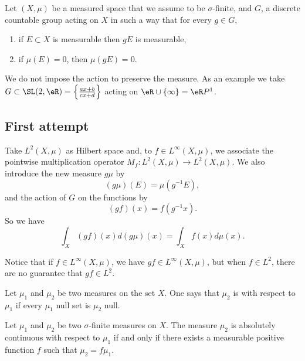 Let $(X,\mu)$ be a measured space that we assume to be $\sigma$-finite, and $G$, a discrete countable group acting on $X$ in such a way that for every $g\in G$,
\begin{enumerate}
\item if $E\subset X$ is measurable then $gE$ is measurable,
\item if $\mu(E)=0$, then $\mu(gE)=0$.
\end{enumerate}
We do not impose the action to preserve the measure. As an example we take $G\subset\SL(2,\eR)=\left\{ \frac{ ax+b }{ cx+d } \right\}$ acting on $\eR\cup\{ \infty\}=\eR P^1$.

					\subsection{First attempt}

Take $L^2(X,\mu)$ as Hilbert space and, to $f\in  L^{\infty}(X,\mu)$, we associate the pointwise multiplication operator $M_f\colon  L^2(X,\mu)\to  L^2 (X,\mu)$. We also introduce the new measure $g\mu$ by
\begin{equation}
		(g\mu)(E)=\mu(g^{-1}E),
\end{equation}
and the action of $G$ on the functions by
\begin{equation}
		(gf)(x)=f(g^{-1}x).
\end{equation}
So we have
\begin{equation}
		\int_X (gf)(x)d(g\mu)(x)=\int_X f(x)d\mu(x).
\end{equation}

Notice that if $f\in L^{\infty}(X,\mu)$, we have $gf\in L^{\infty}(X,\mu)$, but when $f\in  L^2$, there are no guarantee that $gf\in  L^2$.

Let $\mu_1$ and $\mu_2$ be two measures on the set $X$. One says that $\mu_2$ is  with respect to $\mu_1$ if every $\mu_1$ null set is $\mu_2$ null.

\begin{theorem}		\label{ThoRadonNikodym}
Let $\mu_1$ and $\mu_2$ be two $\sigma$-finite measures on $X$. The measure $\mu_2$ is absolutely continuous with respect to $\mu_1$ if and only if there exists a measurable positive function $f$ such that $\mu_2=f\mu_1$.
\end{theorem}

